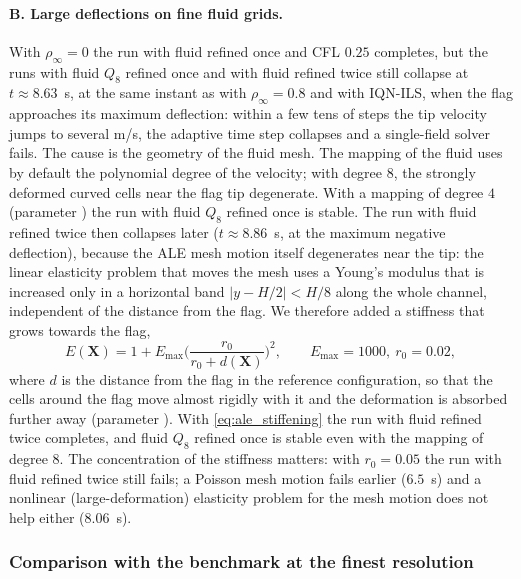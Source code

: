 \documentclass[11pt,a4paper]{article}
\theoremstyle{definition}
\theoremstyle{remark}
\begin{document}
\paragraph{B. Large deflections on fine fluid grids.} With $\rho_\infty=0$ the run with fluid
refined once and CFL $0.25$ completes, but the runs with fluid $Q_8$ refined once and with fluid
refined twice still collapse at $t\approx8.63$~s, at the same instant as with $\rho_\infty=0.8$
and with IQN-ILS, when the flag approaches its maximum deflection: within a few tens of steps the
tip velocity jumps to several m/s, the adaptive time step collapses and a single-field solver
fails. The cause is the geometry of the fluid mesh. The mapping of the fluid uses by default the
polynomial degree of the velocity; with degree $8$, the strongly deformed curved cells near the
flag tip degenerate. With a mapping of degree $4$ (parameter ) the run with
fluid $Q_8$ refined once is stable. The run with fluid refined twice then collapses later
($t\approx8.86$~s, at the maximum negative deflection), because the ALE mesh motion itself
degenerates near the tip: the linear elasticity problem that moves the mesh uses a Young's
modulus that is increased only in a horizontal band $|y-H/2|<H/8$ along the whole channel,
independent of the distance from the flag. We therefore added a stiffness that grows towards the
flag,
\begin{equation}\label{eq:ale_stiffening}
  E(\mathbf X)=1+E_{\max}\Big(\frac{r_0}{r_0+d(\mathbf X)}\Big)^2,\qquad E_{\max}=1000,\ r_0=0.02,
\end{equation}
where $d$ is the distance from the flag in the reference configuration, so that the cells around
the flag move almost rigidly with it and the deformation is absorbed further away (parameter
). With \eqref{eq:ale_stiffening} the run with fluid refined twice completes,
and fluid $Q_8$ refined once is stable even with the mapping of degree $8$. The concentration of
the stiffness matters: with $r_0=0.05$ the run with fluid refined twice still fails; a Poisson
mesh motion fails earlier ($6.5$~s) and a nonlinear (large-deformation) elasticity problem for the
mesh motion does not help either ($8.06$~s).

\subsubsection{Comparison with the benchmark at the finest resolution}\label{sec:final_comparison}
\end{document}
